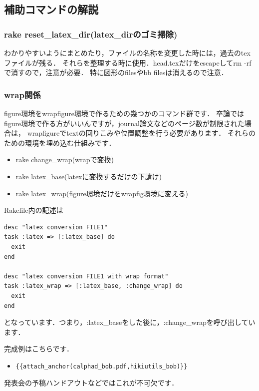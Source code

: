 \subsection{補助コマンドの解説}
\subsubsection{rake reset\_latex\_dir(latex\_dirのゴミ掃除)}
わかりやすいようにまとめたり，ファイルの名称を変更した時には，過去のtexファイルが残る．
それらを整理する時に使用．head.texだけをescapeしてrm -rfで消すので，注意が必要．
特に図形のfilesやbb filesは消えるので注意．

\subsubsection{wrap関係}
figure環境をwrapfigure環境で作るための幾つかのコマンド群です．
卒論ではfigure環境で作る方がいいんですが，journal論文などのページ数が制限された場合は，
wrapfigureでtextの回りこみや位置調整を行う必要があります．
それらのための環境を埋め込む仕組みです．

\begin{itemize}
\item rake change\_wrap(wrapで変換)
\item rake latex\_base(latexに変換するだけの下請け)
\item rake latex\_wrap(figure環境だけをwrapfig環境に変える)
\end{itemize}
Rakefile内の記述は
\begin{lstlisting}[style=customRuby,basicstyle={\scriptsize\ttfamily}]
desc "latex conversion FILE1"
task :latex => [:latex_base] do
  exit
end

desc "latex conversion FILE1 with wrap format"
task :latex_wrap => [:latex_base, :change_wrap] do
  exit
end
\end{lstlisting}
となっています．つまり，:latex\_baseをした後に，:change\_wrapを呼び出しています．

完成例はこちらです．

\begin{itemize}
\item \verb|{{attach_anchor(calphad_bob.pdf,hikiutils_bob)}}|
\end{itemize}
発表会の予稿ハンドアウトなどではこれが不可欠です．

